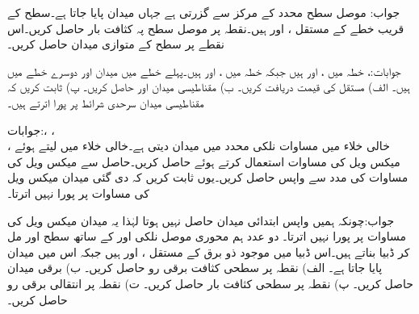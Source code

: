 جواب:
موصل سطح محدد کے مرکز سے گزرتی ہے جہاں میدان  پایا جاتا ہے۔سطح کے قریب خطے کے مستقل ،  اور  ہیں۔نقطہ  پر موصل سطح پہ کثافت بار حاصل کریں۔اس نقطے پر سطح کے متوازی میدان حاصل کریں۔

جوابات:، 
خطہ  میں ،  اور  ہیں جبکہ خطہ  میں ،  اور  ہیں۔پہلے خطے میں میدان  اور دوسرے خطے میں  ہیں۔ الف) مستقل  کی قیمت دریافت کریں۔ ب) مقناطیسی میدان  اور  حاصل کریں۔ پ) ثابت کریں کہ مقناطیسی میدان سرحدی شرائط پر پورا اترتے ہیں۔

جوابات:، ،\\
  ،
خالی خلاء میں مساوات  نلکی محدد میں میدان دیتی ہے۔خالی خلاء میں  لیتے ہوئے میکس ویل کی مساوات  استعمال کرتے ہوئے  حاصل کریں۔حاصل  سے میکس ویل کی مساوات  کی مدد سے  واپس  حاصل کریں۔یوں ثابت کریں کہ دی گئی میدان میکس ویل کی مساوات پر پورا نہیں اترتا۔ 

جواب:چونکہ ہمیں واپس ابتدائی میدان حاصل نہیں ہوتا لہٰذا یہ میدان میکس ویل کی مساوات پر پورا نہیں اترتا۔
دو عدد ہم محوری موصل نلکی  اور   کے ساتھ سطح   اور  مل کر ڈبیا بناتے ہیں۔اس ڈبیا میں موجود ذو برق کے مستقل ،  اور  ہیں جبکہ اس میں میدان  پایا جاتا ہے۔ الف) نقطہ  پر سطحی کثافت برقی رو حاصل کریں۔ ب) برقی میدان  حاصل کریں۔ پ) نقطہ  پر سطحی کثافت بار حاصل کریں۔ ت) نقطہ  پر انتقالی برقی رو حاصل کریں۔


